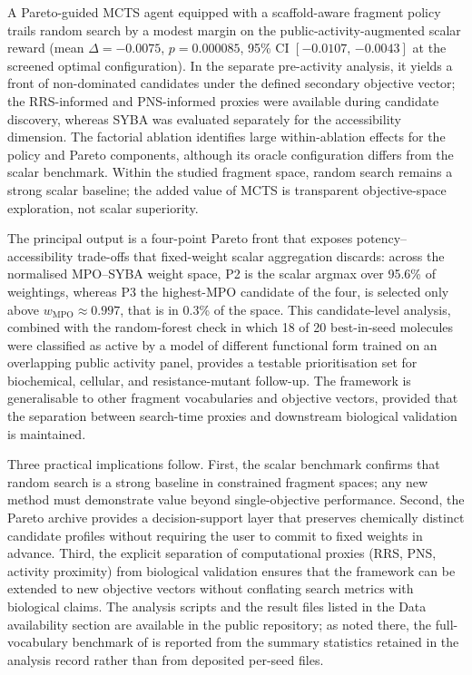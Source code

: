 \documentclass[10pt,a4paper]{article}
\begin{document}
A Pareto-guided MCTS agent equipped with a scaffold-aware fragment policy trails random search by a modest margin on the public-activity-augmented scalar reward (mean $\Delta = \num{-0.0075}$, $p = \num{0.000085}$, 95\% CI $[\num{-0.0107},\,\num{-0.0043}]$ at the screened optimal configuration). In the separate pre-activity analysis, it yields a front of non-dominated candidates under the defined secondary objective vector; the RRS-informed and PNS-informed proxies were available during candidate discovery, whereas SYBA was evaluated separately for the accessibility dimension. The factorial ablation identifies large within-ablation effects for the policy and Pareto components, although its oracle configuration differs from the scalar benchmark. Within the studied fragment space, random search remains a strong scalar baseline; the added value of MCTS is transparent objective-space exploration, not scalar superiority.

The principal output is a four-point Pareto front that exposes potency--accessibility trade-offs that fixed-weight scalar aggregation discards: across the normalised MPO--SYBA weight space, P2 is the scalar argmax over \num{95.6}\% of weightings, whereas P3 the highest-MPO candidate of the four, is selected only above $w_{\mathrm{MPO}} \approx \num{0.997}$, that is in \num{0.3}\% of the space. This candidate-level analysis, combined with the random-forest check in which \num{18} of \num{20} best-in-seed molecules were classified as active by a model of different functional form trained on an overlapping public activity panel, provides a testable prioritisation set for biochemical, cellular, and resistance-mutant follow-up. The framework is generalisable to other fragment vocabularies and objective vectors, provided that the separation between search-time proxies and downstream biological validation is maintained.

Three practical implications follow. First, the scalar benchmark confirms that random search is a strong baseline in constrained fragment spaces; any new method must demonstrate value beyond single-objective performance. Second, the Pareto archive provides a decision-support layer that preserves chemically distinct candidate profiles without requiring the user to commit to fixed weights in advance. Third, the explicit separation of computational proxies (RRS, PNS, activity proximity) from biological validation ensures that the framework can be extended to new objective vectors without conflating search metrics with biological claims. The analysis scripts and the result files listed in the Data availability section are available in the public repository; as noted there, the full-vocabulary benchmark of  is reported from the summary statistics retained in the analysis record rather than from deposited per-seed files.
\end{document}
